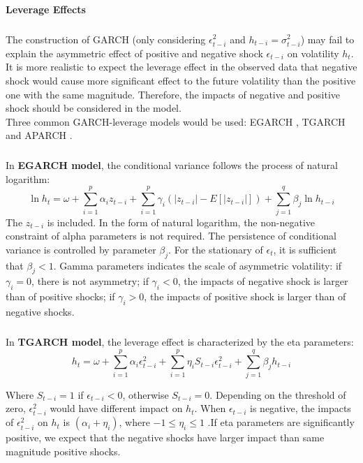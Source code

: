 \documentclass[a4paper]{article}
\begin{document}



\paragraph{Leverage Effects}
\subparagraph*{}
The construction of GARCH (only considering $\epsilon^2_{t-i}$ and $h_{t-i} = \sigma^2_{t-i}$) may fail to explain the asymmetric effect of positive and negative shock $\epsilon_{t-i}$ on volatility $h_t$. It is more realistic to expect the leverage effect in the observed data that negative shock would cause more significant effect to the future volatility than the positive one with the same magnitude. Therefore, the impacts of negative and positive shock should be considered in the model. \\

Three common GARCH-leverage models would be used: EGARCH \cite{nelson1991conditional}, TGARCH \cite{zakoian1994threshold} and APARCH \cite{ding1993long}.

\subparagraph*{}
In \textbf{EGARCH model}, the conditional variance follows the process of natural logarithm:
\[\ln h_t = \omega + \sum^{p}_{i=1} \alpha_i z_{t-i} + \sum^{p}_{i=1} \gamma_i (|z_{t-i}| - E[|z_{t-i}|]) + \sum^q_{j=1} \beta_j \ln h_{t-i}\]
The $z_{t-i}$ is included. In the form of natural logarithm, the non-negative constraint of alpha parameters is not required. The persistence of conditional variance is controlled by parameter $\beta_j$. For the stationary of $\epsilon_t$, it is sufficient that $\beta_j < 1$. Gamma parameters indicates the scale of asymmetric volatility: if $\gamma_i = 0$, there is not asymmetry; if $\gamma_i < 0$, the impacts of negative shock is larger than of positive shocks; if $\gamma_i > 0$, the impacts of positive shock is larger than of negative shocks.

\subparagraph*{}
In \textbf{TGARCH model}, the leverage effect is characterized by the eta parameters:
\[h_t = \omega + \sum^p_{i=1} \alpha_i \epsilon_{t-i}^2 + \sum^p_{i=1} \eta_i S_{t-i} \epsilon_{t-i}^2 +  \sum^q_{j=1} \beta_j h_{t-i}\]

Where $S_{t-i} = 1$ if $\epsilon_{t-i} < 0$, otherwise $S_{t-i} = 0$. Depending on the threshold of zero, $\epsilon_{t-i}^2$ would have different impact on $h_t$. When $\epsilon_{t-i}$ is negative, the impacts of $\epsilon^2_{t-i}$ on $h_t$ is $(\alpha_i + \eta_i)$, where $-1 \leq \eta_i \leq 1$ .If eta parameters are significantly positive, we expect that the negative shocks have larger impact than same magnitude positive shocks.
\end{document}
